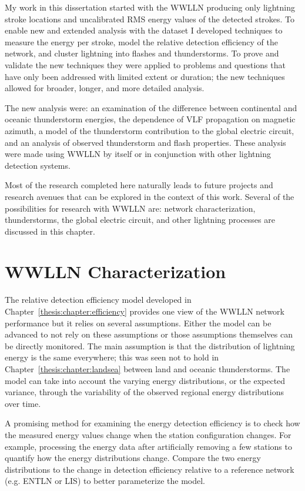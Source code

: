 My work in this dissertation started with the WWLLN producing only lightning stroke locations and uncalibrated RMS energy values of the detected strokes.
To enable new and extended analysis with the dataset I developed techniques to measure the energy per stroke, model the relative detection efficiency of the network, and cluster lightning into flashes and thunderstorms.
To prove and validate the new techniques they were applied to problems and questions that have only been addressed with limited extent or duration; the new techniques allowed for broader, longer, and more detailed analysis.

The new analysis were: an examination of the difference between continental and oceanic thunderstorm energies, the dependence of VLF propagation on magnetic azimuth, a model of the thunderstorm contribution to the global electric circuit, and an analysis of observed thunderstorm and flash properties.
These analysis were made using WWLLN by itself or in conjunction with other lightning detection systems.

Most of the research completed here naturally leads to future projects and research avenues that can be explored in the context of this work.
Several of the possibilities for research with WWLLN are: network characterization, thunderstorms, the global electric circuit, and other lightning processes are discussed in this chapter.

\section{WWLLN Characterization}

The relative detection efficiency model developed in Chapter~\ref{thesis:chapter:efficiency} provides one view of the WWLLN network performance but it relies on several assumptions.
Either the model can be advanced to not rely on these assumptions or those assumptions themselves can be directly monitored.
The main assumption is that the distribution of lightning energy is the same everywhere; this was seen not to hold in Chapter~\ref{thesis:chapter:landsea} between land and oceanic thunderstorms.
The model can take into account the varying energy distributions, or the expected variance, through the variability of the observed regional energy distributions over time.

A promising method for examining the energy detection efficiency is to check how the measured energy values change when the station configuration changes.
For example, processing the energy data after artificially removing a few stations to quantify how the energy distributions change.
Compare the two energy distributions to the change in detection efficiency relative to a reference network (e.g. ENTLN or LIS) to better parameterize the model.

